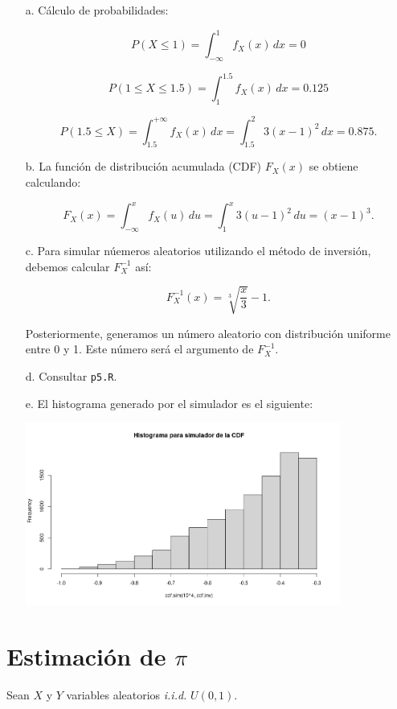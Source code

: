 \documentclass[11pt,letterpaper]{article}
\begin{document}
	\begin{itemize}
		\item[a.] Cálculo de probabilidades:
		
		\[ 
		P(X \leq 1) 
		= \int_{-\infty}^{1} f_X(x)\, dx = 0
		\]
		
		\[ 
		P(1 \leq X \leq 1.5) 
		= \int_{1}^{1.5} f_X(x)\, dx = 0.125
		\]
		
		\[ 
		P(1.5 \leq X) 
		= \int_{1.5}^{+\infty} f_X(x)\, dx 
		= \int_{1.5}^{2} 3(x-1)^2\, dx = 0.875.
		\]
		
		\item[b.] La función de distribución acumulada (CDF) $F_X(x)$ se obtiene calculando:
		
		\[ 
		F_X(x) = \int_{-\infty}^{x} f_X(u)\, du 
		= \int_{1}^{x} 3(u-1)^2\, du 
		= (x-1)^3\text{.} 
		\]
		
		\item[c.] Para simular núemeros aleatorios utilizando el método de inversión, debemos calcular $F_X^{-1}$ así:
		
		\[ 
		F_X^{-1}(x) = \sqrt[3]{\frac{x}{3}}-1 .
		\]
		
		Posteriormente, generamos un número aleatorio con distribución uniforme entre 0 y 1. Este número será el argumento de $F_X^{-1}$.
		
		\item[d.] Consultar \texttt{p5.R}.
		\item[e.] El histograma generado por el simulador es el siguiente:
		
		\includegraphics[height=6cm]{hist_p5_inv.png}
	\end{itemize}

	\section{Estimación de $\pi$}
	Sean $X$ y $Y$ variables aleatorios \emph{i.i.d.} $U(0,1)$.
	
\end{document}
